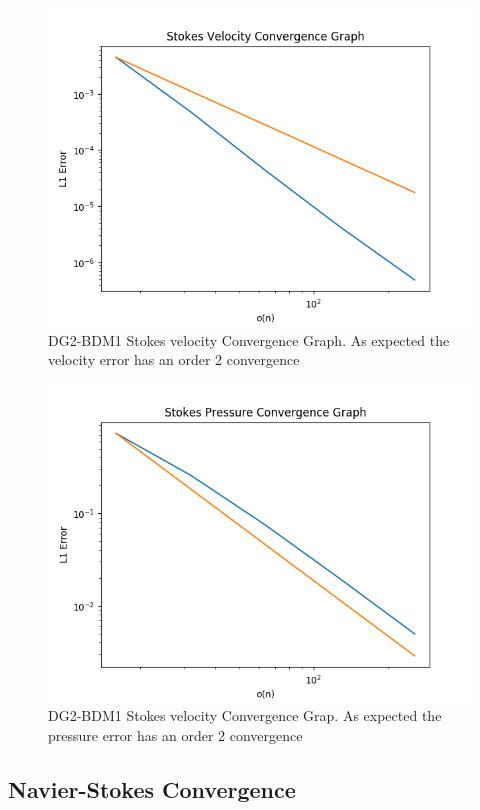 \documentclass[11pt,twoside,a4paper]{article}
\begin{document}
\begin{figure}
  \includegraphics[width=\linewidth]{stokes_convergence_dbc0.png}
  \caption{DG2-BDM1 Stokes velocity Convergence Graph. As expected the velocity error has an order 2 convergence}
\end{figure}

\begin{figure}
\includegraphics[width=\linewidth]{stokes_pressure_convergence_dbc0.png}
  \caption{DG2-BDM1 Stokes velocity Convergence Grap. As expected the pressure error has an order 2 convergence}
\end{figure}

\subsection{Navier-Stokes Convergence}
\end{document}
